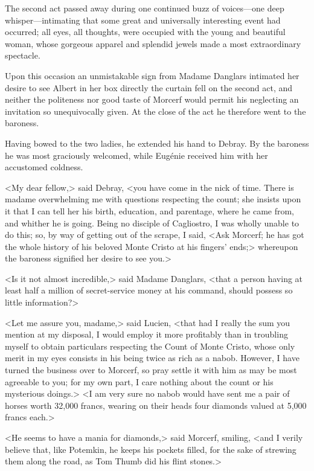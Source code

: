  The second act passed away during one continued buzz of voices—one deep whisper—intimating that some great and universally interesting event had occurred; all eyes, all thoughts, were occupied with the young and beautiful woman, whose gorgeous apparel and splendid jewels made a most extraordinary spectacle. 

 Upon this occasion an unmistakable sign from Madame Danglars intimated her desire to see Albert in her box directly the curtain fell on the second act, and neither the politeness nor good taste of Morcerf would permit his neglecting an invitation so unequivocally given. At the close of the act he therefore went to the baroness. 

 Having bowed to the two ladies, he extended his hand to Debray. By the baroness he was most graciously welcomed, while Eugénie received him with her accustomed coldness. 

 <My dear fellow,> said Debray, <you have come in the nick of time. There is madame overwhelming me with questions respecting the count; she insists upon it that I can tell her his birth, education, and parentage, where he came from, and whither he is going. Being no disciple of Cagliostro, I was wholly unable to do this; so, by way of getting out of the scrape, I said, <Ask Morcerf; he has got the whole history of his beloved Monte Cristo at his fingers' ends;> whereupon the baroness signified her desire to see you.> 

 <Is it not almost incredible,> said Madame Danglars, <that a person having at least half a million of secret-service money at his command, should possess so little information?> 

 <Let me assure you, madame,> said Lucien, <that had I really the sum you mention at my disposal, I would employ it more profitably than in troubling myself to obtain particulars respecting the Count of Monte Cristo, whose only merit in my eyes consists in his being twice as rich as a nabob. However, I have turned the business over to Morcerf, so pray settle it with him as may be most agreeable to you; for my own part, I care nothing about the count or his mysterious doings.>  <I am very sure no nabob would have sent me a pair of horses worth 32,000 francs, wearing on their heads four diamonds valued at 5,000 francs each.> 

 <He seems to have a mania for diamonds,> said Morcerf, smiling, <and I verily believe that, like Potemkin, he keeps his pockets filled, for the sake of strewing them along the road, as Tom Thumb did his flint stones.> 

